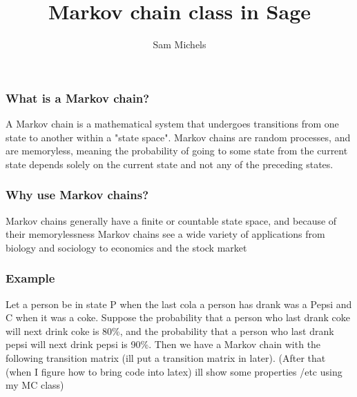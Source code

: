 \documentclass{beamer}
\title{Markov chain class in Sage}
\author{Sam Michels}\institute{Math 480B}
\begin{document}
\begin{frame}
\titlepage

\end{frame}

\begin{frame}
\frametitle{What is a Markov chain?}
A Markov chain is a mathematical system that undergoes transitions from one state to another within a "state space". Markov chains are random processes, and are memoryless, meaning the probability of going to some state from the current state depends solely on the current state and not any of the preceding states.
\end{frame}

\begin{frame}
\frametitle{Why use Markov chains?}
Markov chains generally have a finite or countable state space, and because of their memorylessness Markov chains see a wide variety of applications from biology and sociology to economics and the stock market
\end{frame}


\begin{frame}
\frametitle{Example}
Let a person be in state P when the last cola a person has drank was a Pepsi and C when it was a coke. Suppose the probability that a person who last drank coke will next drink coke is 80\%, and the probability that a person who last drank pepsi will next drink pepsi is 90\%. Then we have a Markov chain with the following transition matrix (ill put a transition matrix in later). (After that (when I figure how to bring code into latex) ill show some properties /etc using my MC class) 
\end{frame}
\end{document}

